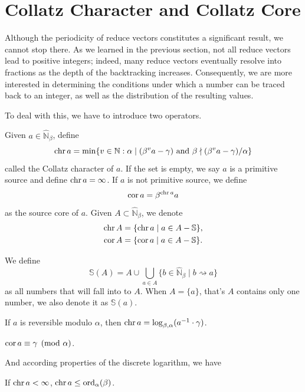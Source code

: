 \section{Collatz Character and Collatz Core}\label{sec:collatz-character-and-collatz-core}

Although the periodicity of reduce vectors constitutes a significant result, we cannot stop there. As we learned in the previous section, not all reduce vectors lead to positive integers; indeed, many reduce vectors eventually resolve into fractions as the depth of the backtracking increases. Consequently, we are more interested in determining the conditions under which a number can be traced back to an integer, as well as the distribution of the resulting values.

To deal with this, we have to introduce two operators.
\begin{definition}\label{def:collatz-character-and-collatz-core}
Given $a \in\widehat{\mathbb{N}}_\beta$, define
\[ \operatorname{chr} a = \min\{v\in\mathbb{N}: \alpha\mid(\beta^{v}a-\gamma) \text{ and } \beta\nmid(\beta^{v}a-\gamma)/\alpha \} \]
called the Collatz character of $a$. If the set is empty, we say $a$ is a primitive source and define $\operatorname{chr} a = \infty$.
If $a$ is not primitive source, we define
\[ \operatorname{cor} a = \beta^{\operatorname{chr} a}a \]
as the source core of $a$.
Given $A \subset \widehat{\mathbb{N}}_\beta$, we denote
\begin{align*}
    \operatorname{chr} A &= \{ \operatorname{chr} a \mid a\in A - \mathbb{S}\}, \\
    \operatorname{cor} A &= \{ \operatorname{cor} a \mid a\in A - \mathbb{S}\}.
\end{align*}
\end{definition}
\begin{definition}
We define
\[\mathbb{S}(A) = A\cup\bigcup_{a\in A}\{ b\in \widehat{\mathbb{N}}_{\beta} \mid b\rightsquigarrow a \}\]
as all numbers that will fall into to $A$.
When $A = \{a\}$, that's $A$ contains only one number, we also denote it as $\mathbb{S}(a)$.
\end{definition}
\begin{proposition}
    If $a$ is reversible modulo $\alpha$, then $\operatorname{chr} a = \log_{\beta, \alpha}(a^{-1}\cdot \gamma)$.
\end{proposition}
\begin{proposition}
    $\operatorname{cor} a\equiv \gamma \pmod{\alpha}$.
\end{proposition}
And according properties of the discrete logarithm, we have
\begin{proposition}\label{prop:chr-le-ord}
    If $\operatorname{chr} a < \infty$, $\operatorname{chr} a \le \operatorname{ord}_{\alpha}(\beta)$.
\end{proposition}
